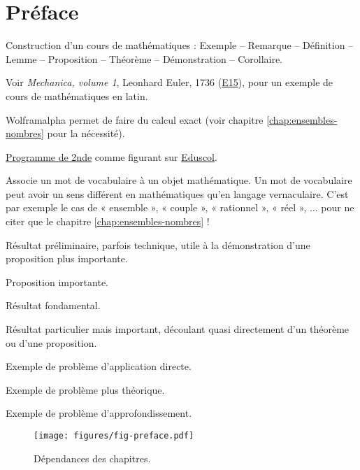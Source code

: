
\chapter*{Préface}

Construction d'un cours de mathématiques : Exemple -- Remarque -- Définition -- Lemme -- Proposition -- Théorème -- Démonstration -- Corollaire.

Voir \emph{Mechanica, volume 1}, Leonhard Euler, 1736 (\href{https://scholarlycommons.pacific.edu/euler-works/15/}{E15}), pour un exemple de cours de mathématiques en latin.

Wolframalpha permet de faire du calcul exact (voir chapitre \ref{chap:ensembles-nombres} pour la nécessité).

\href{https://eduscol.education.fr/document/24553/download}{Programme de 2nde} comme figurant sur 
\href{https://eduscol.education.fr/1723/programmes-et-ressources-en-mathematiques-voie-gt}{Eduscol}.

\begin{definition*}
Associe un mot de vocabulaire à un objet mathématique.
Un mot de vocabulaire peut avoir un sens différent en mathématiques qu'en langage vernaculaire.
C'est par exemple le cas de « ensemble », « couple », « rationnel », « réel », ... pour ne citer que le chapitre \ref{chap:ensembles-nombres} !
\end{definition*}

\begin{lemme*}
	Résultat préliminaire, parfois technique, utile à la démonstration d'une proposition plus importante.
\end{lemme*}

\begin{proposition*}
	Proposition importante.
\end{proposition*}

\begin{theorem*}
	Résultat fondamental.
\end{theorem*}

\begin{corollaire*}
	Résultat particulier mais important, découlant quasi directement d'un théorème ou d'une proposition.
\end{corollaire*}

\begin{Exercise}[counter=preface]
	Exemple de problème d'application directe.
\end{Exercise}
\begin{Exercise}[difficulty=1, counter=preface]
	Exemple de problème plus théorique.
\end{Exercise}
\begin{Exercise}[difficulty=2, counter=preface]
	Exemple de problème d'approfondissement.
\end{Exercise}

\newpage
\begin{figure}
	\centering
	\texttt{[image: figures/fig-preface.pdf]}
	\caption{Dépendances des chapitres.}
\end{figure}
	